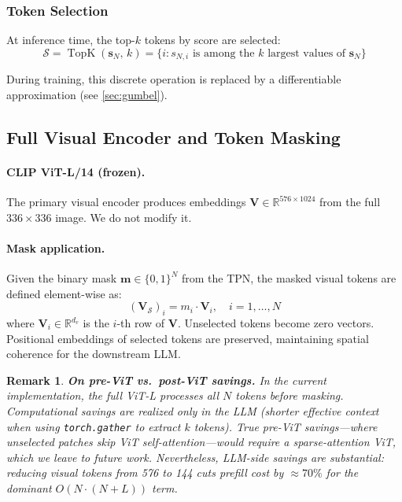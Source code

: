 \documentclass[12pt,a4paper]{article}
\DeclareMathOperator{\TopK}{TopK}
\newcommand{\R}{\mathbb{R}}
\newcommand{\vm}{\mathbf{m}}     %
\newcommand{\vs}{\mathbf{s}}     %
\newcommand{\mV}{\mathbf{V}}     %
\newtheorem{remark}{Remark}
\begin{document}
\subsubsection{Token Selection}

At inference time, the top-$k$ tokens by score are selected:
\begin{equation}
  \mathcal{S} = \TopK(\vs_N,\, k) = \{i : s_{N,i}
    \text{ is among the } k \text{ largest values of } \vs_N\}
  \label{eq:topk}
\end{equation}

During training, this discrete operation is replaced by a differentiable
approximation (see \cref{sec:gumbel}).

\subsection{Full Visual Encoder and Token Masking}

\paragraph{CLIP ViT-L/14 (frozen).}
The primary visual encoder produces embeddings $\mV \in \R^{576 \times 1024}$
from the full $336 \times 336$ image. We do not modify it.

\paragraph{Mask application.}
Given the binary mask $\vm \in \{0,1\}^N$ from the TPN, the masked visual
tokens are defined element-wise as:
\begin{equation}
  (\mV_\mathcal{S})_i = m_i \cdot \mathbf{V}_i, \quad i = 1, \ldots, N
  \label{eq:masking}
\end{equation}
where $\mathbf{V}_i \in \R^{d_v}$ is the $i$-th row of $\mV$. Unselected tokens
become zero vectors. Positional embeddings of selected tokens are preserved,
maintaining spatial coherence for the downstream LLM.

\begin{remark}
  \label{rem:pre_vit}
  \textbf{On pre-ViT vs.\ post-ViT savings.} In the current implementation,
  the full ViT-L processes all $N$ tokens before masking. Computational savings
  are realized only in the LLM (shorter effective context when using
  \texttt{torch.gather} to extract $k$ tokens). True pre-ViT savings---where
  unselected patches skip ViT self-attention---would require a sparse-attention
  ViT, which we leave to future work. Nevertheless, LLM-side savings are
  substantial: reducing visual tokens from 576 to 144 cuts prefill cost by
  $\approx 70\%$ for the dominant $O(N \cdot (N+L))$ term.
\end{remark}
\end{document}
